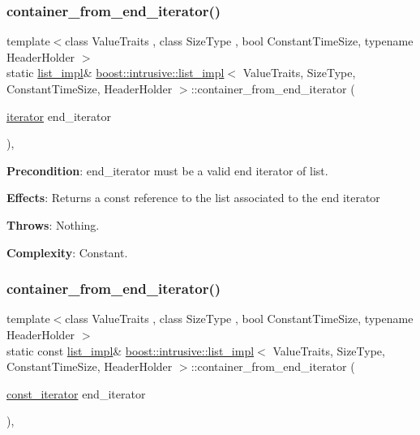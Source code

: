 \subsubsection{\texorpdfstring{container\+\_\+from\+\_\+end\+\_\+iterator()}{container\_from\_end\_iterator()}\hspace{0.1cm}{\footnotesize\ttfamily [1/2]}}
{\footnotesize\ttfamily template$<$class Value\+Traits , class Size\+Type , bool Constant\+Time\+Size, typename Header\+Holder $>$ \\
static \hyperlink{classboost_1_1intrusive_1_1list__impl}{list\+\_\+impl}\& \hyperlink{classboost_1_1intrusive_1_1list__impl}{boost\+::intrusive\+::list\+\_\+impl}$<$ Value\+Traits, Size\+Type, Constant\+Time\+Size, Header\+Holder $>$\+::container\+\_\+from\+\_\+end\+\_\+iterator (\begin{DoxyParamCaption}\item[{\hyperlink{classboost_1_1intrusive_1_1list__impl_a15c0189bf62eb9fb98bc07ef10b8cb23}{iterator}}]{end\+\_\+iterator }\end{DoxyParamCaption})\hspace{0.3cm}{\ttfamily [inline]}, {\ttfamily [static]}}

{\bfseries Precondition}\+: end\+\_\+iterator must be a valid end iterator of list.

{\bfseries Effects}\+: Returns a const reference to the list associated to the end iterator

{\bfseries Throws}\+: Nothing.

{\bfseries Complexity}\+: Constant. \mbox{\label{classboost_1_1intrusive_1_1list__impl_a1dabad9119bf0e3ab256f08944e14521}} 
\subsubsection{\texorpdfstring{container\+\_\+from\+\_\+end\+\_\+iterator()}{container\_from\_end\_iterator()}\hspace{0.1cm}{\footnotesize\ttfamily [2/2]}}
{\footnotesize\ttfamily template$<$class Value\+Traits , class Size\+Type , bool Constant\+Time\+Size, typename Header\+Holder $>$ \\
static const \hyperlink{classboost_1_1intrusive_1_1list__impl}{list\+\_\+impl}\& \hyperlink{classboost_1_1intrusive_1_1list__impl}{boost\+::intrusive\+::list\+\_\+impl}$<$ Value\+Traits, Size\+Type, Constant\+Time\+Size, Header\+Holder $>$\+::container\+\_\+from\+\_\+end\+\_\+iterator (\begin{DoxyParamCaption}\item[{\hyperlink{classboost_1_1intrusive_1_1list__impl_af4ced710fe02662c5650d161af83d8cd}{const\+\_\+iterator}}]{end\+\_\+iterator }\end{DoxyParamCaption})\hspace{0.3cm}{\ttfamily [inline]}, {\ttfamily [static]}}

